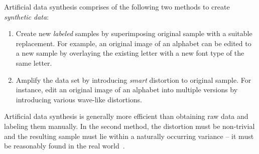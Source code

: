 Artificial data synthesis comprises of the following two methods to create \textit{synthetic data}: 
\begin{enumerate}
\item Create new \textit{labeled} samples by superimposing original sample with a suitable replacement. For example, an original image of an alphabet can be edited to a new sample by overlaying the existing letter with a new font type of the same letter.
\item Amplify the data set by introducing \textit{smart} distortion to original sample. For instance, edit an original image of an alphabet into multiple versions by introducing various wave-like distortions.
\end{enumerate}

Artificial data synthesis is generally more efficient than obtaining raw data and labeling them manually. In the second method, the distortion must be non-trivial and the resulting sample must lie within a naturally occurring variance -- it must be reasonably found in the real world~\cite{Ng12}.
